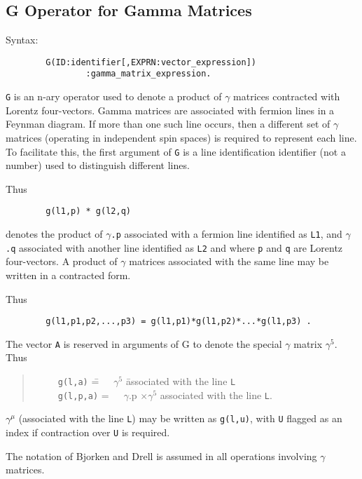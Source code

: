 \documentclass[11pt,letterpaper]{book}
\makeatletter
\newcommand{\underscore}{\_}
\newcommand{\ttindex}[1]{{\renewcommand{\_}{\protect\underscore}%
                          \index{#1@{\tt #1}}}}
\makeatother
\begin{document}
\subsection{G Operator for Gamma Matrices}
\ttindex{G}

Syntax:
{\small\begin{verbatim}
        G(ID:identifier[,EXPRN:vector_expression])
                :gamma_matrix_expression.
\end{verbatim}}
{\tt G} is an n-ary operator used to denote a product of $\gamma$ matrices
contracted with Lorentz four-vectors. Gamma matrices are associated with
fermion lines in a Feynman diagram. If more than one such line occurs,
then a different set of $\gamma$ matrices (operating in independent spin
spaces) is required to represent each line. To facilitate this, the first
argument of {\tt G} is a line identification identifier (not a number)
used to distinguish different lines.

Thus
{\small\begin{verbatim}
        g(l1,p) * g(l2,q)
\end{verbatim}}
denotes the product of {\tt $\gamma$.p} associated with a fermion line
identified as {\tt L1}, and {\tt $\gamma$.q} associated with another line
identified as {\tt L2} and where {\tt p} and {\tt q} are Lorentz
four-vectors.  A product of $\gamma$ matrices associated with the same
line may be written in a contracted form.

Thus
{\small\begin{verbatim}
        g(l1,p1,p2,...,p3) = g(l1,p1)*g(l1,p2)*...*g(l1,p3) .
\end{verbatim}}
The vector {\tt A} is reserved in arguments of G to denote the special
$\gamma$ matrix $\gamma^{5}$. Thus
\begin{quote}
\begin{tabbing}
\ \ \ \ \ {\tt g(l,a)}\hspace{0.2in} \= =\ \ \  $\gamma^{5}$ \hspace{0.5in}
\= associated with the line {\tt L} \\[0.1in]
\ \ \ \ \ {\tt g(l,p,a)} \> =\ \ \  $\gamma$.p $\times \gamma^{5}$ \>
associated with the line {\tt L}.
\end{tabbing}
\end{quote}
$\gamma^{\mu}$ (associated with the line {\tt L}) may be written as
{\tt g(l,u)}, with {\tt U} flagged as an index if contraction over {\tt U}
is required.

The notation of Bjorken and Drell is assumed in all operations involving
$\gamma$ matrices.
\end{document}
